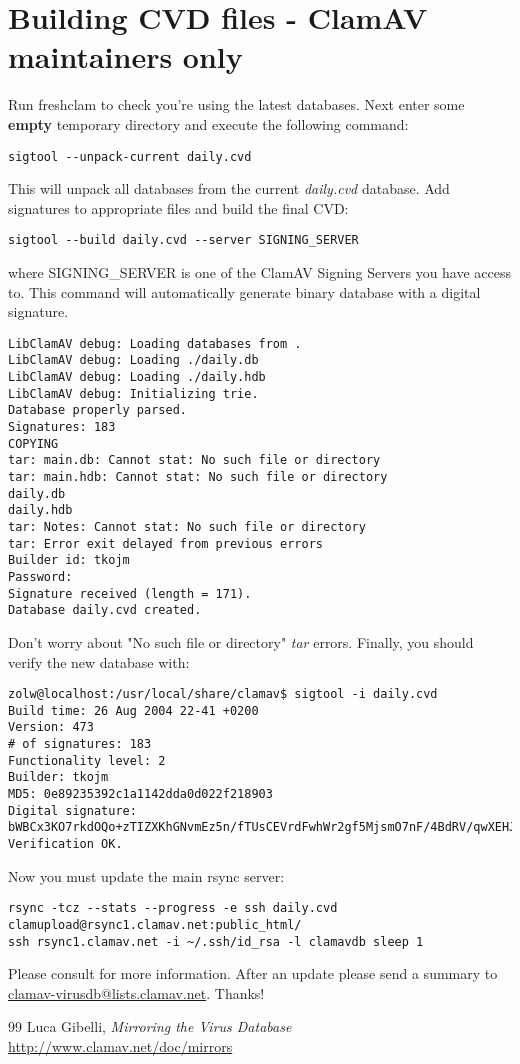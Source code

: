 \documentclass[a4paper,titlepage,12pt]{article}
\begin{document}
    \section{Building CVD files - ClamAV maintainers only}
    Run freshclam to check you're using the latest databases. Next enter
    some \textbf{empty} temporary directory and execute the following command:
    \begin{verbatim}
sigtool --unpack-current daily.cvd
    \end{verbatim}
    This will unpack all databases from the current \emph{daily.cvd} database.
    Add signatures to appropriate files and build the final CVD:
    \begin{verbatim}
sigtool --build daily.cvd --server SIGNING_SERVER
    \end{verbatim}
    where SIGNING\_SERVER is one of the ClamAV Signing Servers you have
    access to. This command will automatically generate binary database with
    a digital signature.
    \begin{verbatim}
LibClamAV debug: Loading databases from .
LibClamAV debug: Loading ./daily.db
LibClamAV debug: Loading ./daily.hdb
LibClamAV debug: Initializing trie.
Database properly parsed.
Signatures: 183
COPYING
tar: main.db: Cannot stat: No such file or directory
tar: main.hdb: Cannot stat: No such file or directory
daily.db
daily.hdb
tar: Notes: Cannot stat: No such file or directory
tar: Error exit delayed from previous errors
Builder id: tkojm
Password:
Signature received (length = 171).
Database daily.cvd created.
    \end{verbatim}
    Don't worry about "No such file or directory" \emph{tar} errors. Finally,
    you should verify the new database with:
    \begin{verbatim}
zolw@localhost:/usr/local/share/clamav$ sigtool -i daily.cvd 
Build time: 26 Aug 2004 22-41 +0200
Version: 473
# of signatures: 183
Functionality level: 2
Builder: tkojm
MD5: 0e89235392c1a1142dda0d022f218903
Digital signature: bWBCx3KO7rkdOQo+zTIZXKhGNvmEz5n/fTUsCEVrdFwhWr2gf5MjsmO7nF/4BdRV/qwXEHJtp0i/2g6awhqUFaO73bbH5f+zmuHy8h0wqYv6jhlIdeA8uh6DGQYBj7azyS9O/0+bXEvU1SutpL3rW8ireFky6zXKv5BVbhnZj9j
Verification OK.
    \end{verbatim}
    Now you must update the main rsync server:
    {\small
    \begin{verbatim}
rsync -tcz --stats --progress -e ssh daily.cvd clamupload@rsync1.clamav.net:public_html/
ssh rsync1.clamav.net -i ~/.ssh/id_rsa -l clamavdb sleep 1
    \end{verbatim}}
    Please consult \cite{mirroring} for more information. After an update please
    send a summary to \url{clamav-virusdb@lists.clamav.net}. Thanks!

    \begin{thebibliography}{99}
	    Luca Gibelli, \emph{Mirroring the Virus Database}\\
	    \url{http://www.clamav.net/doc/mirrors}
    \end{thebibliography}
\end{document}
